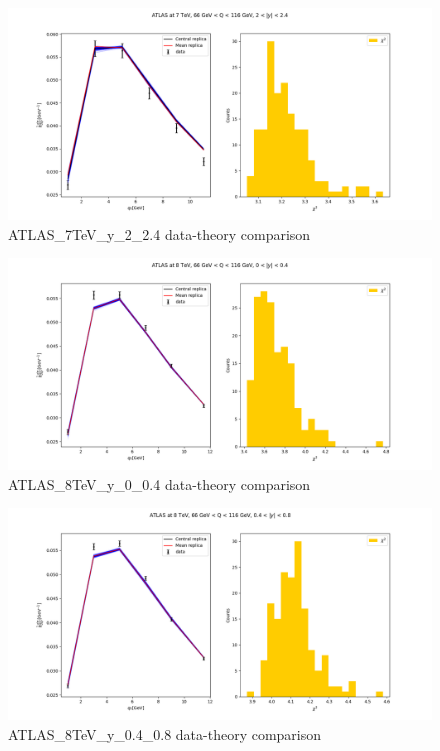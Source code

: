 \documentclass[
]{article}
\begin{document}
\begin{figure}
\centering
\includegraphics{pngplots/ATLAS_7TeV_y_2_2.4.png}
\caption{ATLAS\_7TeV\_y\_2\_2.4 data-theory comparison}
\end{figure}

\begin{figure}
\centering
\includegraphics{pngplots/ATLAS_8TeV_y_0_0.4.png}
\caption{ATLAS\_8TeV\_y\_0\_0.4 data-theory comparison}
\end{figure}

\begin{figure}
\centering
\includegraphics{pngplots/ATLAS_8TeV_y_0.4_0.8.png}
\caption{ATLAS\_8TeV\_y\_0.4\_0.8 data-theory comparison}
\end{figure}
\end{document}
